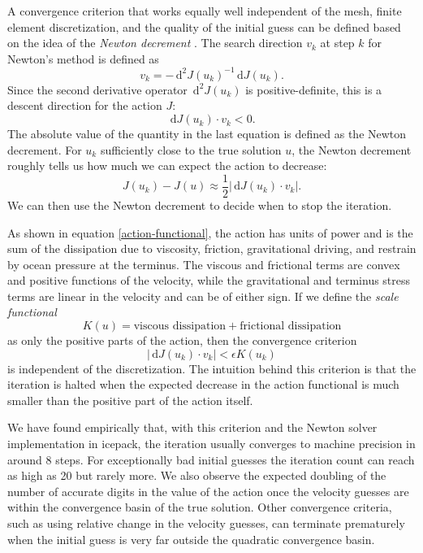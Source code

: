 \documentclass{article}
\theoremstyle{definition}
\theoremstyle{plain}
\newcommand{\ud}{\hspace{2pt}\mathrm{d}}
\begin{document}
A convergence criterion that works equally well independent of the mesh, finite element discretization, and the quality of the initial guess can be defined based on the idea of the \emph{Newton decrement} \citep{nocedal2006numerical}.
The search direction $v_k$ at step $k$ for Newton's method is defined as
\begin{equation}
    v_k = -\ud^2J(u_k)^{-1}\ud J(u_k).
\end{equation}
Since the second derivative operator $\ud^2J(u_k)$ is positive-definite, this is a descent direction for the action $J$:
\begin{equation}
    \ud J(u_k)\cdot v_k < 0.
\end{equation}
The absolute value of the quantity in the last equation is defined as the Newton decrement.
For $u_k$ sufficiently close to the true solution $u$, the Newton decrement roughly tells us how much we can expect the action to decrease:
\begin{equation}
    J(u_k) - J(u) \approx \frac{1}{2}|\ud J(u_k)\cdot v_k|.
\end{equation}
We can then use the Newton decrement to decide when to stop the iteration.

As shown in equation \eqref{action-functional}, the action has units of power and is the sum of the dissipation due to viscosity, friction, gravitational driving, and restrain by ocean pressure at the terminus.
The viscous and frictional terms are convex and positive functions of the velocity, while the gravitational and terminus stress terms are linear in the velocity and can be of either sign.
If we define the \emph{scale functional}
\begin{equation}
    K(u) = \text{viscous dissipation} + \text{frictional dissipation}
\end{equation}
as only the positive parts of the action, then the convergence criterion
\begin{equation}
    |\ud J(u_k)\cdot v_k| < \epsilon K(u_k)
\end{equation}
is independent of the discretization.
The intuition behind this criterion is that the iteration is halted when the expected decrease in the action functional is much smaller than the positive part of the action itself.

We have found empirically that, with this criterion and the Newton solver implementation in icepack, the iteration usually converges to machine precision in around 8 steps.
For exceptionally bad initial guesses the iteration count can reach as high as 20 but rarely more.
We also observe the expected doubling of the number of accurate digits in the value of the action once the velocity guesses are within the convergence basin of the true solution.
Other convergence criteria, such as using relative change in the velocity guesses, can terminate prematurely when the initial guess is very far outside the quadratic convergence basin.
\end{document}
